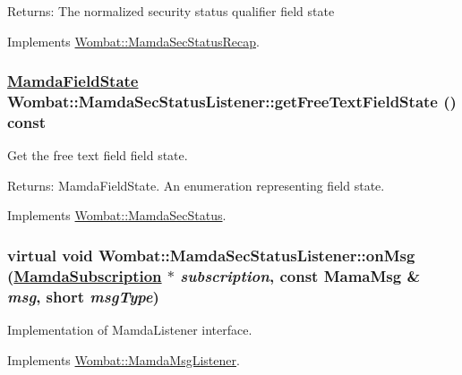 \begin{Desc}
\item[Returns:]The normalized security status qualifier field state \end{Desc}


Implements \hyperlink{classWombat_1_1MamdaSecStatusRecap_c5c0501e80486a14693e4acbb2b17b8e}{Wombat::Mamda\-Sec\-Status\-Recap}.\hypertarget{classWombat_1_1MamdaSecStatusListener_b0f983bb92ba0f415d5e60ed6405c157}{
\subsubsection[getFreeTextFieldState]{\setlength{\rightskip}{0pt plus 5cm}\hyperlink{namespaceWombat_93aac974f2ab713554fd12a1fa3b7d2a}{Mamda\-Field\-State} Wombat::Mamda\-Sec\-Status\-Listener::get\-Free\-Text\-Field\-State () const}}
\label{classWombat_1_1MamdaSecStatusListener_b0f983bb92ba0f415d5e60ed6405c157}


Get the free text field field state. 

\begin{Desc}
\item[Returns:]Mamda\-Field\-State. An enumeration representing field state. \end{Desc}


Implements \hyperlink{classWombat_1_1MamdaSecStatus_f54b5d795c53c279499fc3fca9748622}{Wombat::Mamda\-Sec\-Status}.\hypertarget{classWombat_1_1MamdaSecStatusListener_09bafa70e9b3d41a37175135bd355d72}{
\subsubsection[onMsg]{\setlength{\rightskip}{0pt plus 5cm}virtual void Wombat::Mamda\-Sec\-Status\-Listener::on\-Msg (\hyperlink{classWombat_1_1MamdaSubscription}{Mamda\-Subscription} $\ast$ {\em subscription}, const Mama\-Msg \& {\em msg}, short {\em msg\-Type})}}
\label{classWombat_1_1MamdaSecStatusListener_09bafa70e9b3d41a37175135bd355d72}


Implementation of Mamda\-Listener interface. 



Implements \hyperlink{classWombat_1_1MamdaMsgListener_c700829ebcce095b95b8b67b39a1c67d}{Wombat::Mamda\-Msg\-Listener}.